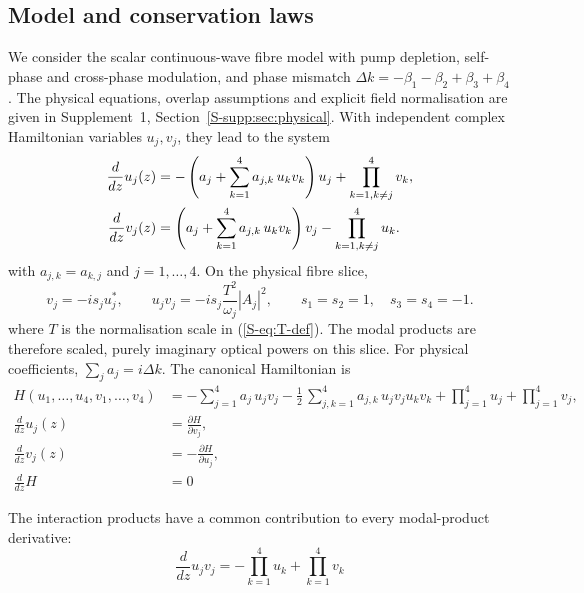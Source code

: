 \documentclass{optica-article}
\numberwithin{equation}{section}
\newcommand{\externaleqref}[1]{\textup{(\ref*{#1})}}
\begin{document}
\subsection{Model and conservation laws}\label{sec:fwm-model}
We consider the scalar continuous-wave fibre model with pump depletion, self-phase and cross-phase modulation, and phase mismatch $\Delta k=-\beta_1-\beta_2+\beta_3+\beta_4$ \cite{agrawalNonlinearFiberOptics2019,stolenParametricAmplificationFrequency1982}.
The physical equations, overlap assumptions and explicit field normalisation are given in Supplement~1, Section~\ref*{S-supp:sec:physical}.
With independent complex Hamiltonian variables $u_j,v_j$, they lead to the system
\begin{align}
\frac{d}{d z} u_j{\left(z \right)} &= - \left({a}_{j} + \sum_{k=1}^{4} {a}_{j,k}\,u_k v_k \right) u_j + \prod\limits_{k=1, k \ne j}^{4} v_k, \notag \\
\frac{d}{d z} v_j{\left(z \right)} &= \left({a}_{j} + \sum_{k=1}^{4} {a}_{j,k}\,u_k v_k \right) v_j - \prod\limits_{k=1, k \ne j}^{4} u_k. \label{eq:uv-system}
\end{align}
with $a_{j,k}=a_{k,j}$ and $j=1,\ldots,4$.
On the physical fibre slice,
\begin{equation}
v_j=-is_j u_j^*,\qquad
u_jv_j=-is_j\frac{T^2}{\omega_j}|A_j|^2,
\qquad s_1=s_2=1,\quad s_3=s_4=-1.
\label{eq:physical-real-slice}
\end{equation}
where $T$ is the normalisation scale in \externaleqref{S-eq:T-def}.
The modal products are therefore scaled, purely imaginary optical powers on this slice.
For physical coefficients, $\sum_j a_j=i\Delta k$.
The canonical Hamiltonian is
\begin{align}
\label{eq:ham-uv}
H(u_1,\dots, u_4, v_1, \dots, v_4) &= -\sum_{j=1}^{4} a_{j}\, u_j v_j - \frac{1}{2}\,\sum_{j,k=1}^{4} a_{j,k}\, u_j v_j u_k v_k + \prod\limits_{j=1}^{4} u_j + \prod\limits_{j=1}^{4} v_j, \\
\frac{d}{d z} u_j{\left(z \right)} &= \frac{\partial H}{\partial v_j}, \\
\frac{d}{d z} v_j{\left(z \right)} &= -\frac{\partial H}{\partial u_j}, \\
\frac{d}{d z} H &= 0
\end{align}

The interaction products have a common contribution to every modal-product derivative:
\begin{equation}
\label{eq:duv_j}
\frac{d}{d z} u_j v_j = - \prod\limits_{k=1}^{4} u_k + \prod\limits_{k=1}^{4} v_k
\end{equation}
\end{document}
